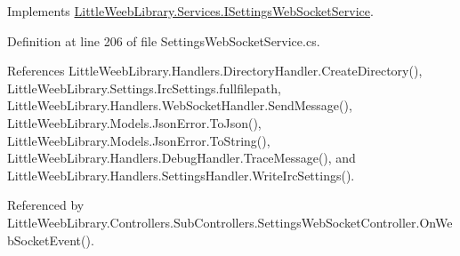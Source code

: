 Implements \mbox{\hyperlink{interface_little_weeb_library_1_1_services_1_1_i_settings_web_socket_service_a295e6129fa61ceca9564f774442ca79e}{Little\+Weeb\+Library.\+Services.\+I\+Settings\+Web\+Socket\+Service}}.



Definition at line 206 of file Settings\+Web\+Socket\+Service.\+cs.



References Little\+Weeb\+Library.\+Handlers.\+Directory\+Handler.\+Create\+Directory(), Little\+Weeb\+Library.\+Settings.\+Irc\+Settings.\+fullfilepath, Little\+Weeb\+Library.\+Handlers.\+Web\+Socket\+Handler.\+Send\+Message(), Little\+Weeb\+Library.\+Models.\+Json\+Error.\+To\+Json(), Little\+Weeb\+Library.\+Models.\+Json\+Error.\+To\+String(), Little\+Weeb\+Library.\+Handlers.\+Debug\+Handler.\+Trace\+Message(), and Little\+Weeb\+Library.\+Handlers.\+Settings\+Handler.\+Write\+Irc\+Settings().



Referenced by Little\+Weeb\+Library.\+Controllers.\+Sub\+Controllers.\+Settings\+Web\+Socket\+Controller.\+On\+Web\+Socket\+Event().



